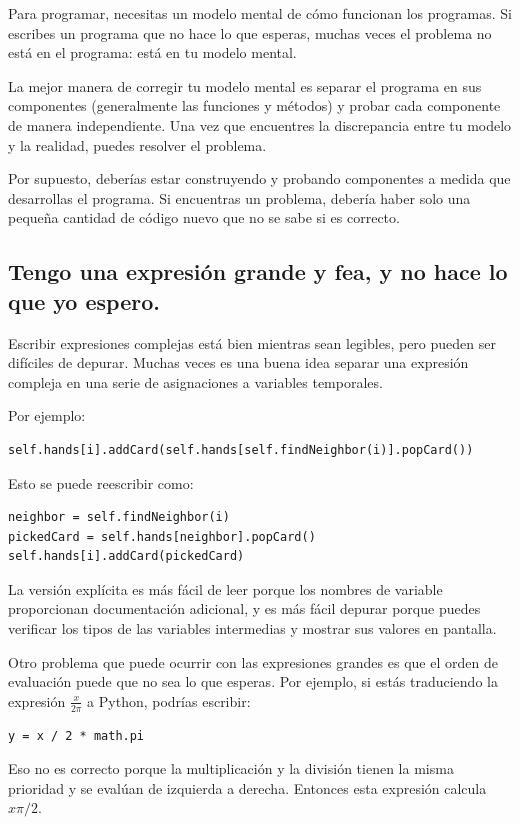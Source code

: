\documentclass[10pt]{book}
\begin{document}
Para programar, necesitas un modelo mental de cómo
funcionan los programas.  Si escribes un programa que no hace lo que esperas,
muchas veces el problema no está en el programa: está en tu modelo
mental.

La mejor manera de corregir tu modelo mental es separar el programa
en sus componentes (generalmente las funciones y métodos) y probar
cada componente de manera independiente.  Una vez que encuentres la discrepancia
entre tu modelo y la realidad, puedes resolver el problema.

Por supuesto, deberías estar construyendo y probando componentes a medida que
desarrollas el programa.  Si encuentras un problema,
debería haber solo una pequeña cantidad de código nuevo
que no se sabe si es correcto.


\subsection{Tengo una expresión grande y fea, y no
hace lo que yo espero.}

Escribir expresiones complejas está bien mientras sean legibles,
pero pueden ser difíciles de depurar.  Muchas veces es una buena idea
separar una expresión compleja en una serie de asignaciones a
variables temporales.

Por ejemplo:

\begin{verbatim}
self.hands[i].addCard(self.hands[self.findNeighbor(i)].popCard())
\end{verbatim}
%
Esto se puede reescribir como:

\begin{verbatim}
neighbor = self.findNeighbor(i)
pickedCard = self.hands[neighbor].popCard()
self.hands[i].addCard(pickedCard)
\end{verbatim}
%
La versión explícita es más fácil de leer porque los nombres de variable
proporcionan documentación adicional, y es más fácil depurar
porque puedes verificar los tipos de las variables intermedias
y mostrar sus valores en pantalla.

Otro problema que puede ocurrir con las expresiones grandes es que
el orden de evaluación puede que no sea lo que esperas.
Por ejemplo, si estás traduciendo la expresión
$\frac{x}{2 \pi}$ a Python, podrías escribir:

\begin{verbatim}
y = x / 2 * math.pi
\end{verbatim}
%
Eso no es correcto porque la multiplicación y la división tienen
la misma prioridad y se evalúan de izquierda a derecha.
Entonces esta expresión calcula $x \pi / 2$.
\end{document}
